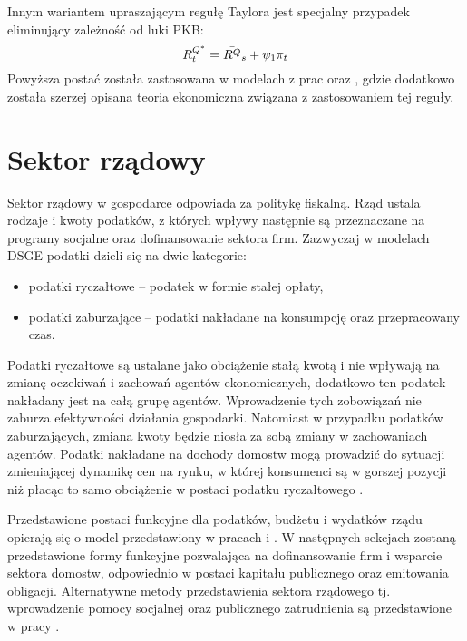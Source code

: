 Innym wariantem upraszającym regułę Taylora jest specjalny przypadek eliminujący zależność od luki PKB:
\begin{equation}
    R^{Q^*}_t = \bar{R^{Q}}_s + \psi_1 \pi_t
\end{equation}
Powyższa postać została zastosowana w modelach z prac \cite{gali_gov_spending} oraz \cite{gali}, gdzie dodatkowo została szerzej opisana teoria ekonomiczna związana z zastosowaniem tej reguły.

\section{Sektor rządowy}
\label{gov_sector}

Sektor rządowy w gospodarce odpowiada za politykę fiskalną. Rząd ustala rodzaje i kwoty podatków, z których wpływy  następnie są przeznaczane na programy socjalne oraz dofinansowanie sektora firm. Zazwyczaj w modelach DSGE podatki dzieli się na dwie kategorie:
\begin{itemize}
    \item podatki ryczałtowe -- podatek w formie stałej opłaty,
    \item podatki zaburzające -- podatki nakładane na konsumpcję oraz przepracowany czas.
\end{itemize}

Podatki ryczałtowe są ustalane jako obciążenie stałą kwotą i nie wpływają na zmianę oczekiwań i zachowań agentów ekonomicznych, dodatkowo ten podatek nakładany jest na całą grupę agentów\cite{costaBook}. Wprowadzenie tych zobowiązań nie zaburza efektywności działania gospodarki. Natomiast w przypadku podatków zaburzających, zmiana kwoty będzie niosła za sobą zmiany w zachowaniach agentów. Podatki nakładane na dochody domostw mogą prowadzić do sytuacji zmieniającej dynamikę cen na rynku, w której konsumenci są w gorszej pozycji niż płacąc to samo obciążenie w postaci podatku ryczałtowego \cite{distortionary_taxes}. 

Przedstawione postaci funkcyjne dla podatków, budżetu i wydatków rządu opierają się o model przedstawiony w pracach \cite{costaBook} i \cite{gali_gov_spending}. W następnych sekcjach zostaną przedstawione formy funkcyjne pozwalająca na dofinansowanie firm i wsparcie sektora domostw, odpowiednio w postaci kapitału publicznego oraz emitowania obligacji. Alternatywne metody przedstawienia sektora rządowego tj. wprowadzenie pomocy socjalnej oraz publicznego zatrudnienia są przedstawione w pracy \cite{costaBook}.

